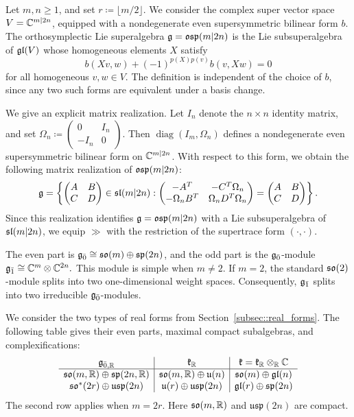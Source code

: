  Let $m,n\geq1$, and set $r\coloneqq\lfloor m/2\rfloor$. We consider the complex super vector space $V=\CC^{m\vert 2n}$, equipped with a  nondegenerate even
supersymmetric bilinear form $b$. The orthosymplectic Lie superalgebra $\gg=\osp(m\vert2n)$ is the Lie subsuperalgebra of $\gl(V)$ whose homogeneous elements $X$ satisfy
\begin{equation*}
b(Xv,w)+(-1)^{p(X)p(v)}b(v,Xw)=0
\end{equation*}
for all homogeneous $v,w\in V$. The definition is independent of the choice of $b$, since any two such forms are equivalent under a basis change.

We give an explicit matrix realization. Let $I_n$ denote the $n\times n$ identity matrix, and set
$
\Omega_n\coloneqq
\left(\begin{smallmatrix}
0&I_n\\
-I_n&0
\end{smallmatrix}\right).
$ 
Then $\operatorname{diag}(I_m,\Omega_n)$ defines a nondegenerate even supersymmetric bilinear form on $\CC^{m\vert2n}$. With respect to this form, we obtain the following matrix realization of $\osp(m\vert2n)$:
\begin{equation}
\gg=
\left\{
\begin{pmatrix}A&B\\C&D\end{pmatrix}\in\sl(m\vert 2n):
\begin{pmatrix}
-A^T&-C^T\Omega_n\\
-\Omega_nB^T&\Omega_nD^T\Omega_n
\end{pmatrix}
=
\begin{pmatrix}A&B\\C&D\end{pmatrix}
\right\}.
\end{equation}
Since this realization identifies $\gg=\osp(m\vert2n)$ with a Lie subsuperalgebra of $\sl(m\vert2n)$, we equip $\gg$ with the restriction of the supertrace form $(\cdot,\cdot)$.


The even part is
$
\even\cong\so(m)\oplus\sp(2n)
$,
and the odd part is the $\even$-module
$
\odd\cong\CC^m\otimes\CC^{2n}.
$
This module is simple when $m\neq2$. If $m=2$,
the standard $\so(2)$-module splits into two one-dimensional
weight spaces. Consequently, $\odd$ splits into two
irreducible $\even$-modules.

We consider the two types of real forms from
Section~\ref{subsec::real_forms}. The following table gives
their even parts, maximal compact subalgebras, and
complexifications:
\begin{equation}
\begin{array}{c|c|c}
\gg_{\bar0,\RR}
&\kk_{\RR}
&\kk=\kk_{\RR}\otimes_{\RR}\CC\\ \hline
\so(m,\RR)\oplus\sp(2n,\RR)
&\so(m,\RR)\oplus\mathfrak u(n)
&\so(m)\oplus\gl(n)\\
\so^*(2r)\oplus\mathfrak{usp}(2n)
&\mathfrak u(r)\oplus\mathfrak{usp}(2n)
&\gl(r)\oplus\sp(2n)
\end{array}
\end{equation}
The second row applies when $m=2r$.
Here $\so(m,\RR)$ and $\mathfrak{usp}(2n)$ are compact.

